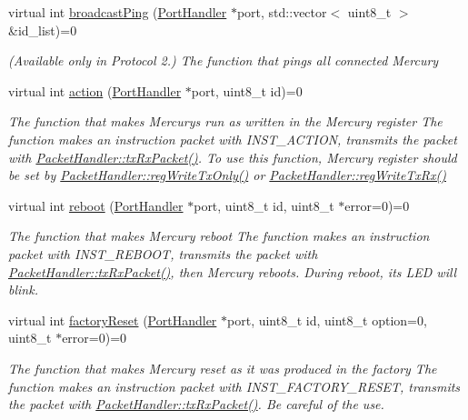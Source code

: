 \begin{DoxyCompactItemize}
virtual int \hyperlink{classmercury_1_1_packet_handler_aae8b5fb10e57973884589a0318e30fad}{broadcast\+Ping} (\hyperlink{classmercury_1_1_port_handler}{Port\+Handler} $\ast$port, std\+::vector$<$ uint8\+\_\+t $>$ \&id\+\_\+list)=0
\begin{DoxyCompactList}\small\item\em (Available only in Protocol 2.) The function that pings all connected Mercury \end{DoxyCompactList}\item 
virtual int \hyperlink{classmercury_1_1_packet_handler_a2ce31bd650d032c4bff957c9e453f38e}{action} (\hyperlink{classmercury_1_1_port_handler}{Port\+Handler} $\ast$port, uint8\+\_\+t id)=0
\begin{DoxyCompactList}\small\item\em The function that makes Mercurys run as written in the Mercury register  The function makes an instruction packet with I\+N\+S\+T\+\_\+\+A\+C\+T\+I\+ON,  transmits the packet with \hyperlink{classmercury_1_1_packet_handler_ac7ceeaec210827d119199144badaad3a}{Packet\+Handler\+::tx\+Rx\+Packet()}.  To use this function, Mercury register should be set by \hyperlink{classmercury_1_1_packet_handler_a0b0daaabd6473e14b2fbfbbf3260bc7b}{Packet\+Handler\+::reg\+Write\+Tx\+Only()} or \hyperlink{classmercury_1_1_packet_handler_a9944f0271cdcc637429b678a3cd73273}{Packet\+Handler\+::reg\+Write\+Tx\+Rx()} \end{DoxyCompactList}\item 
virtual int \hyperlink{classmercury_1_1_packet_handler_a3ef14097ca9a667b90660edb72c61427}{reboot} (\hyperlink{classmercury_1_1_port_handler}{Port\+Handler} $\ast$port, uint8\+\_\+t id, uint8\+\_\+t $\ast$error=0)=0
\begin{DoxyCompactList}\small\item\em The function that makes Mercury reboot  The function makes an instruction packet with I\+N\+S\+T\+\_\+\+R\+E\+B\+O\+OT,  transmits the packet with \hyperlink{classmercury_1_1_packet_handler_ac7ceeaec210827d119199144badaad3a}{Packet\+Handler\+::tx\+Rx\+Packet()},  then Mercury reboots.  During reboot, its L\+ED will blink. \end{DoxyCompactList}\item 
virtual int \hyperlink{classmercury_1_1_packet_handler_a03067ed71a4267c2b4fd3c21e63884f2}{factory\+Reset} (\hyperlink{classmercury_1_1_port_handler}{Port\+Handler} $\ast$port, uint8\+\_\+t id, uint8\+\_\+t option=0, uint8\+\_\+t $\ast$error=0)=0
\begin{DoxyCompactList}\small\item\em The function that makes Mercury reset as it was produced in the factory  The function makes an instruction packet with I\+N\+S\+T\+\_\+\+F\+A\+C\+T\+O\+R\+Y\+\_\+\+R\+E\+S\+ET,  transmits the packet with \hyperlink{classmercury_1_1_packet_handler_ac7ceeaec210827d119199144badaad3a}{Packet\+Handler\+::tx\+Rx\+Packet()}.  Be careful of the use. \end{DoxyCompactList}\item 

\end{DoxyCompactItemize}
